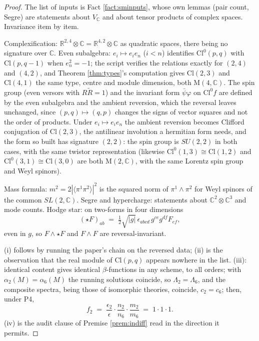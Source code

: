 \documentclass[11pt]{article}
\theoremstyle{definition}
\newcommand{\Cl}{\mathrm{Cl}}
\newcommand{\R}{\mathbb{R}}
\newcommand{\C}{\mathbb{C}}
\newcommand{\Mat}{\mathrm{M}}
\newcommand{\br}[1]{\langle #1\rangle}
\begin{document}
\begin{proof}
The list of inputs is Fact \ref{fact:sminputs}, whose own lemmas (pair count, Segre) are statements about $V_{\C}$ and about tensor products of complex spaces. Invariance item by item.

Complexification: $\R^{2,4} \otimes \C = \R^{4,2} \otimes \C$ as quadratic spaces, there being no signature over $\C$. Even subalgebra: $e_{i} \mapsto e_{i}e_{n}$ ($i < n$) identifies $\Cl^{0}(p,q)$ with $\Cl(p, q-1)$ when $e_{n}^{2} = -1$; the script verifies the relations exactly for $(2,4)$ and $(4,2)$, and Theorem \ref{thm:types}'s computation gives $\Cl(2,3)$ and $\Cl(4,1)$ the same type, centre and module dimension, both $\Mat(4,\C)$. The spin group (even versors with $R\tilde{R} = 1$) and the invariant form $\bar{\psi}\varphi$ on $\Cl^{0}f$ are defined by the even subalgebra and the ambient reversion, which the reversal leaves unchanged, since $(p,q) \mapsto (q,p)$ changes the signs of vector squares and not the order of products. Under $e_{i} \mapsto e_{i}e_{n}$ the ambient reversion becomes Clifford conjugation of $\Cl(2,3)$, the antilinear involution a hermitian form needs, and the form so built has signature $(2,2)$: the spin group is $SU(2,2)$ in both cases, with the same twistor representation (likewise $\Cl^{0}(1,3) \cong \Cl(1,2)$ and $\Cl^{0}(3,1) \cong \Cl(3,0)$ are both $\Mat(2,\C)$, with the same Lorentz spin group and Weyl spinors).

Mass formula: $m^{2} = 2|\br{\pi^{1}\pi^{2}}|^{2}$ is the squared norm of $\pi^{1} \wedge \pi^{2}$ for Weyl spinors of the common $SL(2,\C)$. Segre and hypercharge: statements about $\C^{2} \otimes \C^{3}$ and mode counts. Hodge star: on two-forms in four dimensions
\[
(\star F)_{ab} \;=\; \tfrac{1}{2}\sqrt{|g|}\,\epsilon_{abcd}\,g^{ce}g^{df}F_{ef},
\]
even in $g$, so $F \wedge \star F$ and $F \wedge F$ are reversal-invariant.

(i) follows by running the paper's chain on the reversed data; (ii) is the observation that the real module of $\Cl(p,q)$ appears nowhere in the list. (iii): identical content gives identical $\beta$-functions in any scheme, to all orders; with $\alpha_{2}(M) = \alpha_{6}(M)$ the running solutions coincide, so $\Lambda_{2} = \Lambda_{6}$, and the composite spectra, being those of isomorphic theories, coincide, $c_{2} = c_{6}$; then, under P4,
\[
f_{2} \;=\; \frac{\epsilon_{2}}{\epsilon}\cdot\frac{n_{2}}{n_{6}}\cdot\frac{m_{2}}{m_{6}} \;=\; 1 \cdot 1 \cdot 1 .
\] (iv) is the audit clause of Premise \ref{prem:indiff} read in the direction it permits.
\end{proof}
\end{document}
